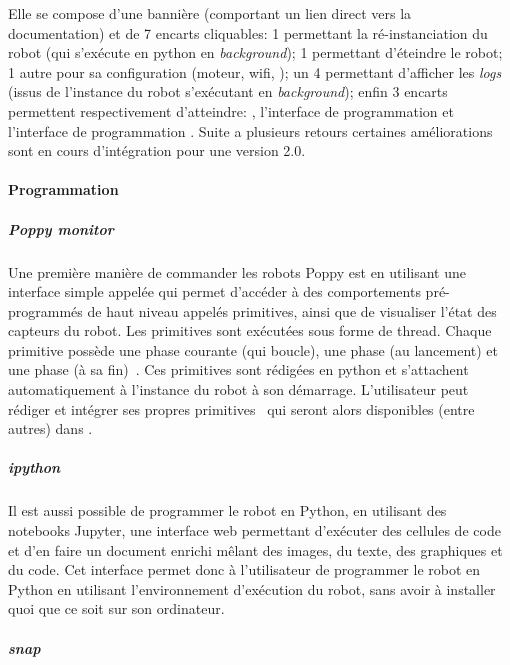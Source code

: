             Elle se compose d'une bannière (comportant un lien direct vers la documentation) et de 7 encarts cliquables: 1 permettant la ré-instanciation du robot (qui s'exécute en python en \textit{background}); 1 permettant d'éteindre le robot; 1 autre pour sa configuration (moteur, wifi, \etc); un 4\ieme{} permettant d'afficher les \textit{logs} (issus de l'instance du robot s'exécutant en \textit{background}); enfin 3 encarts permettent respectivement d'atteindre: , l'interface de programmation  et l'interface de programmation . Suite a plusieurs retours certaines améliorations sont en cours d'intégration pour une version 2.0.
        \paragraph{Programmation}\label{sec:programmation}
            \subparagraph{Poppy monitor}\label{sec:monitor}
                Une première manière de commander les robots Poppy est en utilisant une interface simple appelée  qui permet d’accéder à des comportements pré-programmés de haut niveau appelés primitives, ainsi que de visualiser l’état des capteurs du robot. Les primitives sont exécutées sous forme de thread. Chaque primitive possède une phase courante (qui boucle), une phase  (au lancement) et une phase  (à sa fin)~. Ces primitives sont rédigées en python et s'attachent automatiquement à l'instance du robot à son démarrage. L'utilisateur peut rédiger et intégrer ses propres primitives~ qui seront alors disponibles (entre autres) dans .
            \subparagraph{ipython} 
                Il est aussi possible de programmer le robot en Python, en utilisant des notebooks Jupyter, une interface web permettant d’exécuter des cellules de code et d’en faire un document enrichi mêlant des images, du texte, des graphiques et du code. Cet interface permet donc à l'utilisateur de programmer le robot en Python en utilisant l'environnement d'exécution du robot, sans avoir à installer quoi que ce soit sur son ordinateur.
            \subparagraph{snap}\label{sec:snap_choice}
